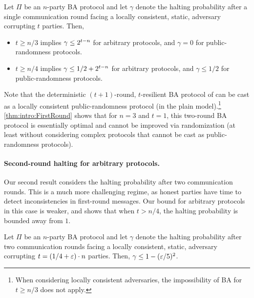 \begin{theorem}\label{thm:intro:FirstRound}
Let $\Pi$ be an $n$-party BA protocol and let $\gamma$ denote the halting probability after a single communication round facing a locally consistent, static, adversary corrupting $t$ parties. Then,
\begin{itemize}
	\item $t \ge n/3$ implies $\gamma \le 2^{t-n}$ for arbitrary protocols, and $\gamma=0$ for public-randomness protocols.
	\item $t \ge n/4$ implies $\gamma \le 1/2+2^{t-n}$ for arbitrary protocols, and $\gamma \leq 1/2$ for public-randomness protocols.
\end{itemize}
\end{theorem}

Note that the deterministic $(t+1)$-round, $t$-resilient BA protocol of \citet{DS83} can be cast as a locally consistent public-randomness protocol (in the plain model).\footnote{When considering locally consistent adversaries, the impossibility of BA for $t\geq n/3$ does not apply.}
\cref{thm:intro:FirstRound} shows that for $n=3$ and $t=1$, this two-round BA protocol is essentially optimal and cannot be improved via randomization (at least without considering complex protocols that cannot be cast as public-randomness protocols).

\paragraph{Second-round halting for arbitrary protocols.}
Our second result considers the halting probability after two communication rounds.
This is a much more challenging regime, as honest parties have time to detect inconsistencies in first-round messages. Our bound for arbitrary protocols in this case is weaker, and shows that when $t>n/4$, the halting probability is bounded away from $1$.

\begin{theorem}\label{thm:intro:SecondRound:Arb}
Let $\Pi$ be an $n$-party BA protocol and let $\gamma$ denote the halting probability after two communication rounds facing a locally consistent, static, adversary corrupting $t=(1/4+\varepsilon)\cdot n$ parties.
Then, $\gamma \le 1 - (\varepsilon /5)^2$.
\end{theorem}

